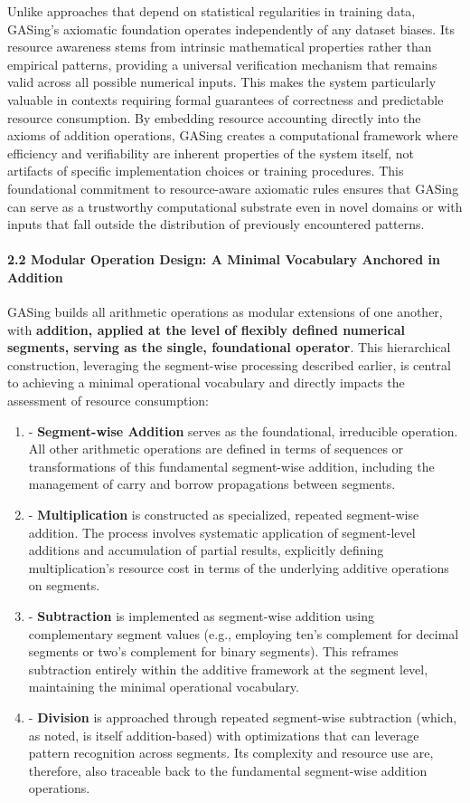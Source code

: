 Unlike approaches that depend on statistical regularities in training data, GASing's axiomatic foundation operates independently of any dataset biases. Its resource awareness stems from intrinsic mathematical properties rather than empirical patterns, providing a universal verification mechanism that remains valid across all possible numerical inputs. This makes the system particularly valuable in contexts requiring formal guarantees of correctness and predictable resource consumption. By embedding resource accounting directly into the axioms of addition operations, GASing creates a computational framework where efficiency and verifiability are inherent properties of the system itself, not artifacts of specific implementation choices or training procedures. This foundational commitment to resource-aware axiomatic rules ensures that GASing can serve as a trustworthy computational substrate even in novel domains or with inputs that fall outside the distribution of previously encountered patterns.

\paragraph{2.2 Modular Operation Design: A Minimal Vocabulary Anchored in Addition}
GASing builds all arithmetic operations as modular extensions of one another, with \textbf{addition, applied at the level of flexibly defined numerical segments, serving as the single, foundational operator}. This hierarchical construction, leveraging the segment-wise processing described earlier, is central to achieving a minimal operational vocabulary and directly impacts the assessment of resource consumption:

\begin{enumerate}
  \item - \textbf{Segment-wise Addition} serves as the foundational, irreducible operation. All other arithmetic operations are defined in terms of sequences or transformations of this fundamental segment-wise addition, including the management of carry and borrow propagations between segments.
  \item - \textbf{Multiplication} is constructed as specialized, repeated segment-wise addition. The process involves systematic application of segment-level additions and accumulation of partial results, explicitly defining multiplication's resource cost in terms of the underlying additive operations on segments.
  \item - \textbf{Subtraction} is implemented as segment-wise addition using complementary segment values (e.g., employing ten's complement for decimal segments or two's complement for binary segments). This reframes subtraction entirely within the additive framework at the segment level, maintaining the minimal operational vocabulary.
  \item - \textbf{Division} is approached through repeated segment-wise subtraction (which, as noted, is itself addition-based) with optimizations that can leverage pattern recognition across segments. Its complexity and resource use are, therefore, also traceable back to the fundamental segment-wise addition operations.
\end{enumerate}

